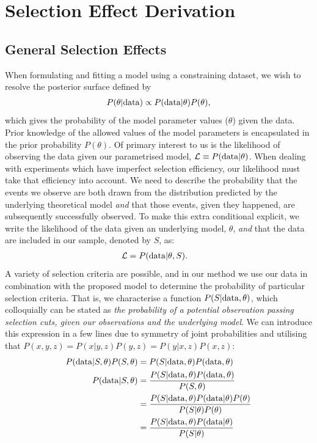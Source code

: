 \documentclass[a4paper,fleqn,usenatbib]{mnras}
\begin{document}
\appendix

\section{Selection Effect Derivation}
\label{app:selection}

\subsection{General Selection Effects}

When formulating and fitting a model using a constraining dataset, we wish to resolve the posterior surface defined by
\begin{align}
P(\theta | {\rm data}) \propto P({\rm data} | \theta) P(\theta),
\end{align}
which gives the probability of the model parameter values ($\theta$) given the data.  Prior knowledge of the allowed values of the model parameters is encapsulated in the prior probability $P(\theta)$. Of primary interest to us is the likelihood of observing the data given our parametrised model, $\mathcal{L} \equiv P({\rm data} | \theta)$. When dealing with experiments which have imperfect selection efficiency, our likelihood must take that efficiency into account.  We need to describe the probability that the events we observe are both drawn from the distribution predicted by the underlying theoretical model \textit{and} that those events, given they happened, are subsequently successfully observed.  To make this extra conditional explicit, we write the likelihood of the data given an underlying model, $\theta$, \textit{and} that the data are included in our sample, denoted by $S$, as:
\begin{align}
\mathcal{L} &= P({\rm data} | \theta, S). \label{eq:app_like}
\end{align}
A variety of selection criteria are possible, and in our method we use our data in combination with the proposed model to determine the probability of particular selection criteria.  That is, we characterise a function $P(S|{\rm data},\theta)$, which colloquially can be stated as \textit{the probability of a potential observation passing selection cuts, given our observations and the underlying model}. We can introduce this expression in a few lines due to symmetry of joint probabilities and utilising that $P(x,y,z) = P(x|y,z)P(y,z) = P(y|x, z)P(x, z)$:
\begin{align}
P({\rm data} | S , \theta) P(S, \theta) &= P(S | {\rm data}, \theta) P({\rm data}, \theta)\\
P({\rm data} | S , \theta) &= \frac{ P(S | {\rm data}, \theta) P({\rm data}, \theta) }{ P(S, \theta) }\\
&= \frac{ P(S | {\rm data}, \theta) P({\rm data} | \theta) P(\theta)}{ P(S | \theta)  P(\theta)}\\
&= \frac{ P(S | {\rm data}, \theta) P({\rm data} | \theta)}{ P(S | \theta) }
\end{align}
\end{document}
